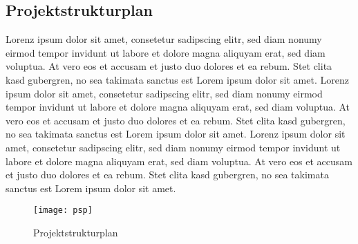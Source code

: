 \subsection{Projektstrukturplan}\label{subsec:projektstrukturplan}
Lorenz ipsum dolor sit amet, consetetur sadipscing elitr, sed diam nonumy eirmod tempor invidunt ut labore et dolore magna aliquyam erat, sed diam voluptua.
At vero eos et accusam et justo duo dolores et ea rebum.
Stet clita kasd gubergren, no sea takimata sanctus est Lorem ipsum dolor sit amet.
Lorenz ipsum dolor sit amet, consetetur sadipscing elitr, sed diam nonumy eirmod tempor invidunt ut labore et dolore magna aliquyam erat, sed diam voluptua.
At vero eos et accusam et justo duo dolores et ea rebum.
Stet clita kasd gubergren, no sea takimata sanctus est Lorem ipsum dolor sit amet.
Lorenz ipsum dolor sit amet, consetetur sadipscing elitr, sed diam nonumy eirmod tempor invidunt ut labore et dolore magna aliquyam erat, sed diam voluptua.
At vero eos et accusam et justo duo dolores et ea rebum.
Stet clita kasd gubergren, no sea takimata sanctus est Lorem ipsum dolor sit amet.

\begin{figure}[H]
    \centering
    \texttt{[image: psp]}
    \caption{Projektstrukturplan}\label{fig:projektstrukturplan}
\end{figure}